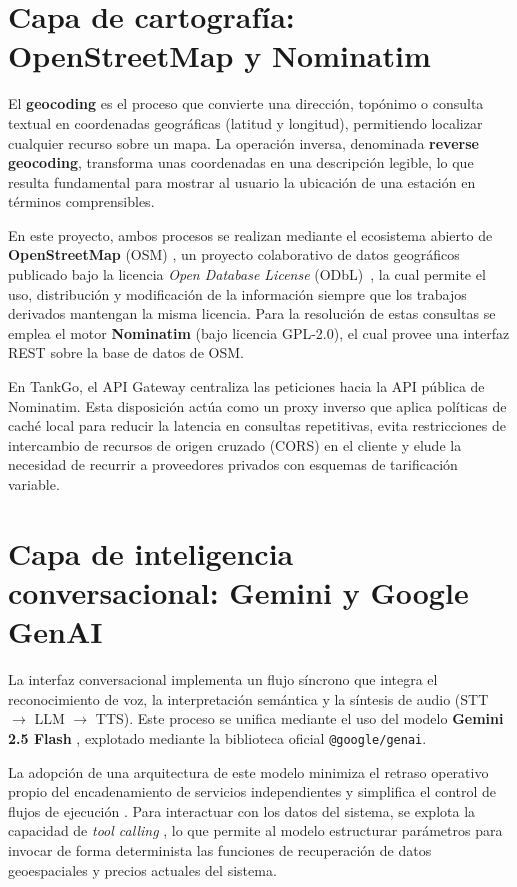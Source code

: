 \section{Capa de cartografía: OpenStreetMap y Nominatim}
El \textbf{geocoding} es el proceso que convierte una dirección, topónimo o consulta textual
en coordenadas geográficas (latitud y longitud), permitiendo localizar cualquier recurso sobre un mapa.
La operación inversa, denominada \textbf{reverse geocoding}, transforma unas coordenadas en una descripción
legible, lo que resulta fundamental para mostrar al usuario la ubicación de una estación en términos comprensibles.

En este proyecto, ambos procesos se realizan mediante el ecosistema abierto de \textbf{OpenStreetMap} (OSM)
\cite{openstreetmap}, un proyecto colaborativo de datos geográficos publicado bajo la licencia
\textit{Open Database License} (ODbL)~\cite{odbl}, la cual permite el uso, distribución y modificación
de la información siempre que los trabajos derivados mantengan la misma licencia. Para la resolución de
estas consultas se emplea el motor \textbf{Nominatim} (bajo licencia GPL-2.0), el cual provee una interfaz
REST sobre la base de datos de OSM.

En TankGo, el API Gateway centraliza las peticiones hacia la API pública de Nominatim. Esta disposición
actúa como un proxy inverso que aplica políticas de caché local para reducir la latencia en consultas repetitivas,
evita restricciones de intercambio de recursos de origen cruzado (CORS) en el cliente y elude la necesidad de recurrir
a proveedores privados con esquemas de tarificación variable.

\section{Capa de inteligencia conversacional: Gemini y Google GenAI}
La interfaz conversacional implementa un flujo síncrono que integra el reconocimiento de voz, la interpretación semántica y la síntesis de audio (STT $\rightarrow$ LLM $\rightarrow$ TTS).
Este proceso se unifica mediante el uso del modelo \textbf{Gemini 2.5 Flash} \cite{gemini_2_5}, explotado mediante la biblioteca oficial \texttt{@google/genai}.

La adopción de una arquitectura de este modelo minimiza el retraso operativo propio del encadenamiento de servicios independientes
y simplifica el control de flujos de ejecución \cite{Gartner2026Trends}. Para interactuar con los datos del sistema, se explota la
capacidad de \textit{tool calling} \cite{genai_tool_calling}, lo que permite al modelo estructurar parámetros para invocar de forma determinista
las funciones de recuperación de datos geoespaciales y precios actuales del sistema.


